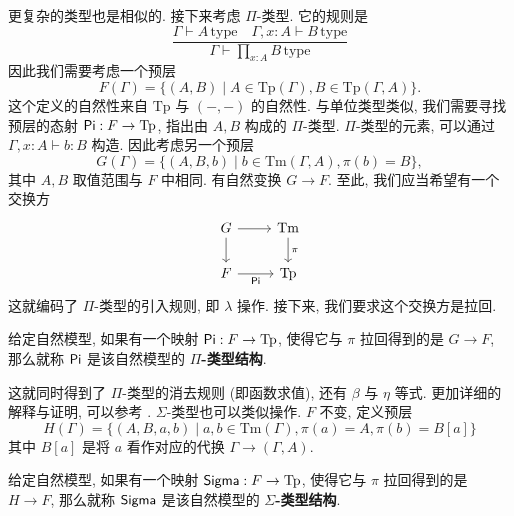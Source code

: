 更复杂的类型也是相似的. 接下来考虑 \(\Pi\)-类型.
它的规则是
\[\frac{\Gamma \vdash A\,\text{type}
\quad\Gamma, x{:}A \vdash B\,\text{type}}
{\Gamma \vdash \prod_{x : A} B\,\text{type}}\]
因此我们需要考虑一个预层
\[F(\Gamma) = \{(A, B) \mid
  A \in \mathrm{Tp}(\Gamma), B \in \mathrm{Tp}(\Gamma, A)\}.\]
这个定义的自然性来自 \(\mathrm{Tp}\) 与 \((-,-)\) 的自然性.
与单位类型类似, 我们需要寻找预层的态射 \(\textnormal{\textsf{Pi}} : F \to \mathrm{Tp}\),
指出由 \(A, B\) 构成的 \(\Pi\)-类型.
\(\Pi\)-类型的元素, 可以通过 \(\Gamma, x{:}A \vdash b : B\) 构造.
因此考虑另一个预层
\[G(\Gamma) = \{(A, B, b) \mid b \in \mathrm{Tm}(\Gamma, A), \pi(b) = B\},\]
其中 \(A, B\) 取值范围与 \(F\) 中相同.
有自然变换 \(G \to F\). 至此, 我们应当希望有一个交换方
\[\begin{tikzcd}
  G & {\mathrm{Tm}} \\
  F & {\mathrm{Tp}}
  \arrow[from=1-1, to=2-1]
  \arrow["{\cons{Pi}}"', from=2-1, to=2-2]
  \arrow["\pi", from=1-2, to=2-2]
  \arrow[from=1-1, to=1-2]
\end{tikzcd}\]
这就编码了 \(\Pi\)-类型的引入规则, 即 \(\lambda\) 操作.
接下来, 我们要求这个交换方是拉回.
\begin{definition}
给定自然模型, 如果有一个映射 \(\textnormal{\textsf{Pi}} : F \to \mathrm{Tp}\),
使得它与 \(\pi\) 拉回得到的是 \(G \to F\), 那么就称
\(\textnormal{\textsf{Pi}}\) 是该自然模型的 \textbf{\(\Pi\)-类型结构}.
\end{definition}
这就同时得到了 \(\Pi\)-类型的消去规则 (即函数求值),
还有 \(\beta\) 与 \(\eta\) 等式.
更加详细的解释与证明, 可以参考 \cite[定理 8]{awodey:2018:natural}.
\(\Sigma\)-类型也可以类似操作.
\(F\) 不变, 定义预层
\[H(\Gamma) = \{(A, B, a, b) \mid
  a,b \in \mathrm{Tm}(\Gamma),
  \pi(a) = A,
  \pi(b) = B[a]\}\]
其中 \(B[a]\) 是将 \(a\) 看作对应的代换 \(\Gamma \to (\Gamma,A)\).
\begin{definition}
给定自然模型, 如果有一个映射 \(\textnormal{\textsf{Sigma}} : F \to \mathrm{Tp}\),
使得它与 \(\pi\) 拉回得到的是 \(H \to F\), 那么就称
\(\textnormal{\textsf{Sigma}}\) 是该自然模型的 \textbf{\(\Sigma\)-类型结构}.
\end{definition}

